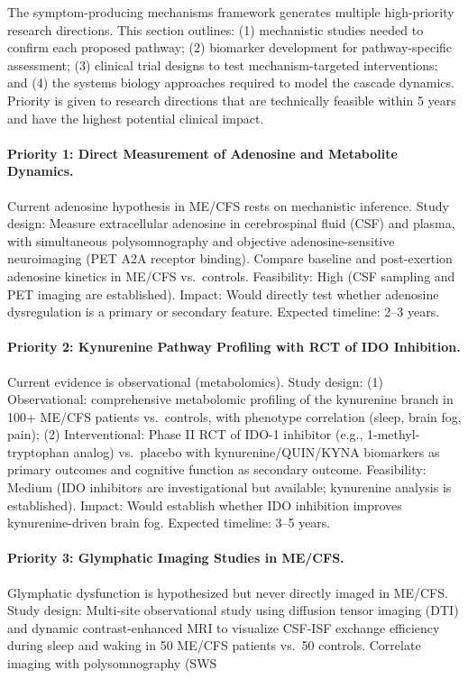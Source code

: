 The symptom-producing mechanisms framework generates multiple high-priority research directions. This section outlines: (1) mechanistic studies needed to confirm each proposed pathway; (2) biomarker development for pathway-specific assessment; (3) clinical trial designs to test mechanism-targeted interventions; and (4) the systems biology approaches required to model the cascade dynamics. Priority is given to research directions that are technically feasible within 5 years and have the highest potential clinical impact.

\paragraph{Priority 1: Direct Measurement of Adenosine and Metabolite Dynamics.}
Current adenosine hypothesis in ME/CFS rests on mechanistic inference. Study design: Measure extracellular adenosine in cerebrospinal fluid (CSF) and plasma, with simultaneous polysomnography and objective adenosine-sensitive neuroimaging (PET A2A receptor binding). Compare baseline and post-exertion adenosine kinetics in ME/CFS vs.~controls. Feasibility: High (CSF sampling and PET imaging are established). Impact: Would directly test whether adenosine dysregulation is a primary or secondary feature. Expected timeline: 2--3 years.

\paragraph{Priority 2: Kynurenine Pathway Profiling with RCT of IDO Inhibition.}
Current evidence is observational (metabolomics). Study design: (1) Observational: comprehensive metabolomic profiling of the kynurenine branch in 100+ ME/CFS patients vs.~controls, with phenotype correlation (sleep, brain fog, pain); (2) Interventional: Phase II RCT of IDO-1 inhibitor (e.g., 1-methyl-tryptophan analog) vs.~placebo with kynurenine/QUIN/KYNA biomarkers as primary outcomes and cognitive function as secondary outcome. Feasibility: Medium (IDO inhibitors are investigational but available; kynurenine analysis is established). Impact: Would establish whether IDO inhibition improves kynurenine-driven brain fog. Expected timeline: 3--5 years.

\paragraph{Priority 3: Glymphatic Imaging Studies in ME/CFS.}
Glymphatic dysfunction is hypothesized but never directly imaged in ME/CFS. Study design: Multi-site observational study using diffusion tensor imaging (DTI) and dynamic contrast-enhanced MRI to visualize CSF-ISF exchange efficiency during sleep and waking in 50 ME/CFS patients vs.~50 controls. Correlate imaging with polysomnography (SWS %

